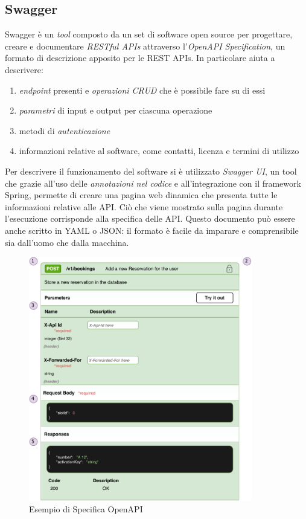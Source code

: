 \subsection{Swagger}
Swagger è un \emph{tool} composto da un set di software open source per progettare, creare e documentare \emph{RESTful APIs} attraverso l’\emph{OpenAPI Specification}, un formato di descrizione apposito per le REST APIs. In particolare aiuta a descrivere:
\begin{enumerate}
    \item \emph{endpoint} presenti e \emph{operazioni CRUD} che è possibile fare su di essi
    \item \emph{parametri} di input e output per ciascuna operazione
    \item metodi di \emph{autenticazione}
    \item informazioni relative al software, come contatti, licenza e termini di utilizzo
\end{enumerate}
Per descrivere il funzionamento del software si è utilizzato \emph{Swagger UI}, un tool che grazie all'uso delle \emph{annotazioni nel codice} e all'integrazione con il framework Spring, permette di creare una pagina web dinamica che presenta tutte le informazioni relative alle API. Ciò che viene mostrato sulla pagina durante l'esecuzione corrisponde alla specifica delle API. Questo documento può essere anche scritto in YAML o JSON: il formato è facile da imparare e comprensibile sia dall'uomo che dalla macchina. 

\begin{figure}[H]
    \centering
    \includegraphics[width=0.87\textwidth]{images/03_2_swaggerui.pdf}
    \caption{Esempio di Specifica OpenAPI}
    \label{fig:swaggerexample}
\end{figure}


